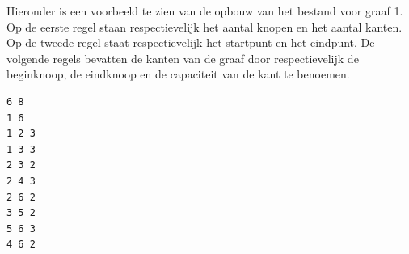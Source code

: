 Hieronder is een voorbeeld te zien van de opbouw van het bestand voor graaf 1. Op de eerste regel staan respectievelijk het aantal knopen en het aantal kanten.
Op de tweede regel staat respectievelijk het startpunt en het eindpunt.
De volgende regels bevatten de kanten van de graaf door respectievelijk de beginknoop, de eindknoop en de capaciteit van de kant te benoemen.

\begin{lstlisting}
6 8
1 6
1 2 3
1 3 3
2 3 2
2 4 3
2 6 2
3 5 2
5 6 3
4 6 2
\end{lstlisting}